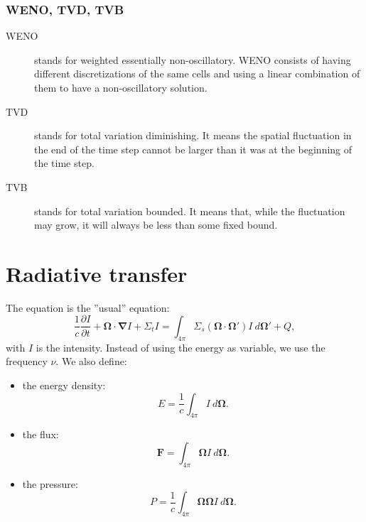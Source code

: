 \documentclass[letterpaper]{report}
\newcommand\bn{\boldsymbol{\nabla}}
\newcommand\bo{\boldsymbol{\Omega}}
\newcommand\bs{\boldsymbol}
\renewcommand{\(}{\left(}
\renewcommand{\)}{\right)}
\renewcommand{\[}{\left[}
\renewcommand{\]}{\right]}
\begin{document}
\subsubsection{WENO, TVD, TVB}
\begin{description}
  \item[WENO] stands for weighted essentially non-oscillatory. WENO consists
  of having different discretizations of the same cells and using a linear
  combination of them to have a non-oscillatory solution.
  \item[TVD] stands for total variation diminishing. It means the spatial
  fluctuation in the end of the time step cannot be larger than it was at the
  beginning of the time step.
  \item[TVB] stands for total variation bounded. It means that, while the
  fluctuation may grow, it will always be less than some fixed bound.
\end{description}

\section{Radiative transfer}
The equation is the ''usual'' equation:
\begin{equation}
  \frac{1}{c}\frac{\partial I}{\partial t} + \bo\cdot \bn I + \Sigma_t I =
  \int_{4\pi} \Sigma_s(\bo\cdot\bo') I\ d\bo' + Q,
\end{equation}
with $I$ is the intensity. Instead of using the energy as variable, we use the
frequency $\nu$.  We also define:
\begin{itemize}
  \item the energy density:
  \begin{equation}
    E = \frac{1}{c}\int_{4\pi} I\ d\bo.
  \end{equation}
  \item the flux:
  \begin{equation}
    \bs{F} = \int_{4\pi} \bo I\ d\bo.
  \end{equation}
  \item the pressure:
  \begin{equation}
    P = \frac{1}{c}\int_{4\pi}\bo\bo I\ d\bo.
  \end{equation}
\end{itemize}
\end{document}
